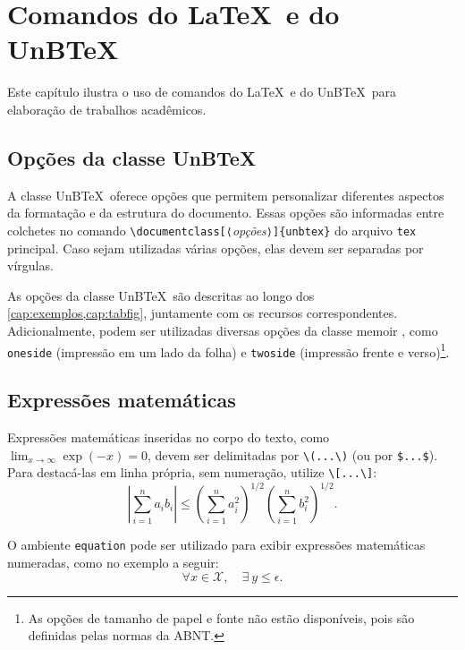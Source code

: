 \chapter{Comandos do \LaTeX\ e do UnB\TeX}
\label{cap:exemplos}

Este capítulo ilustra o uso de comandos do \LaTeX\ e do UnB\TeX\ para elaboração de trabalhos acadêmicos.

\section{Opções da classe UnB\TeX}
\label{sec:opcoes}

A classe UnB\TeX\ oferece opções que permitem personalizar diferentes aspectos da formatação e da estrutura do documento. Essas opções são informadas entre colchetes no comando \texttt{\textbackslash documentclass[⟨}\emph{opções}\texttt{⟩]\{unbtex\}} do arquivo \texttt{tex} principal. Caso sejam utilizadas várias opções, elas devem ser separadas por vírgulas.

As opções da classe UnB\TeX\ são descritas ao longo dos \cref{cap:exemplos,cap:tabfig}, juntamente com os recursos correspondentes. Adicionalmente, podem ser utilizadas diversas opções da classe \textsf{memoir} \cite{memoir}, como \texttt{oneside} (impressão em um lado da folha) e \texttt{twoside} (impressão frente e verso)\footnote{As opções de tamanho de papel e fonte não estão disponíveis, pois são definidas pelas normas da ABNT.}.

\section{Expressões matemáticas}
\label{sec:mat}

Expressões matemáticas inseridas no corpo do texto, como \(\lim_{x \to \infty}\exp(-x) = 0\), devem ser delimitadas por \verb|\(...\)| (ou por \verb|$...$|). Para destacá-las em linha própria, sem numeração, utilize \verb|\[...\]|:
\[
\left|\sum_{i=1}^n a_ib_i\right|
\leq
\left(\sum_{i=1}^n a_i^2\right)^{1/2}
\left(\sum_{i=1}^n b_i^2\right)^{1/2}.
\]

O ambiente \texttt{equation} pode ser utilizado para exibir expressões matemáticas numeradas, como no exemplo a seguir:
\begin{equation}
  \forall x \in \mathcal{X}, \quad \exists \: y \leq \epsilon.
\end{equation}

